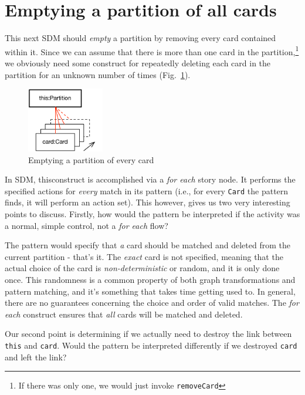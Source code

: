 \newpage
\hypertarget{sec:emptyPartition}{}
\section{Emptying a partition of all cards}
\genHeader

This next SDM should \emph{empty} a partition by removing every card contained within it. Since we can assume that there is more than one card in the
partition,\footnote{If there was only one, we would just invoke \texttt{removeCard}} we obviously need some construct for repeatedly deleting each card in the
partition for an unknown number of times (Fig.~\ref{fig:goal_empty}). 

\begin{figure}[htbp]
	\centering
  \includegraphics[width=0.3\textwidth]{goal_partitionEmpty.pdf}
	\caption{Emptying a partition of every card}
	\label{fig:goal_empty}
\end{figure}
\FloatBarrier

In SDM, thisconstruct is accomplished via a \emph{for each} story node. It performs the specified actions for \emph{every} match in its
pattern (i.e., for every \texttt{Card} the pattern finds, it will perform an action set). This however, gives us two very interesting points to discuss.
Firstly, how would the pattern be interpreted if the activity was a normal, simple control, not a \emph{for each} flow?

The pattern would specify that \emph{a} card should be matched and deleted from the current partition - that's it. The \emph{exact} card is not specified,
meaning that the actual choice of the card is \emph{non-deterministic} or random, and it is only done once. This randomness is a common property of both graph
transformations and pattern matching, and it's something that takes time getting used to.  In general, there are no guarantees concerning the choice and
order of valid matches. The \emph{for each} construct ensures that \emph{all} cards will be matched and deleted.

Our second point is determining if we actually need to destroy the link between \texttt{this} and \texttt{card}. Would the pattern be interpreted differently if we
destroyed \texttt{card} and left the link?

